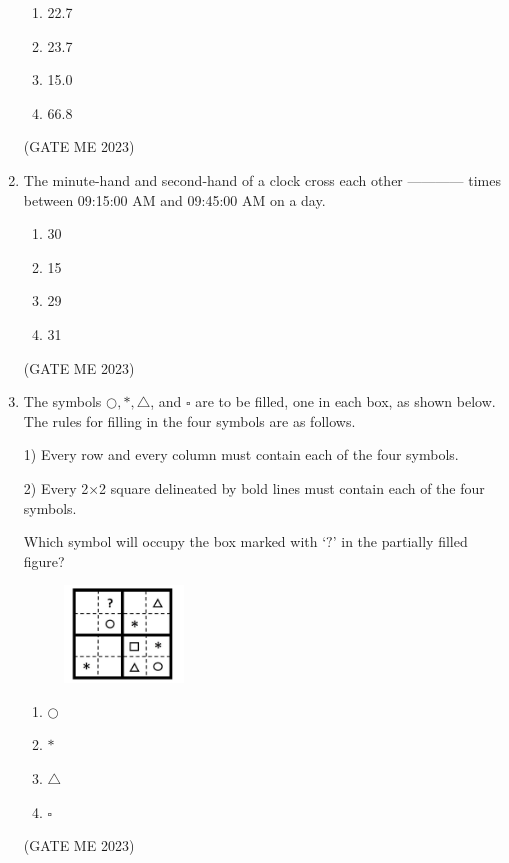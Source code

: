 \documentclass[journal]{IEEEtran}
\begin{document}
\begin{enumerate}
\begin{enumerate}
    \item 22.7
    \item 23.7
    \item 15.0
    \item 66.8
\end{enumerate}
\hfill (GATE ME 2023)

\item The minute-hand and second-hand of a clock cross each other ------------ times between 09:15:00 AM and 09:45:00 AM on a day.

\begin{enumerate}
    \item 30
    \item 15
    \item 29
    \item 31
\end{enumerate}
\hfill (GATE ME 2023)

\item The symbols $ \bigcirc, \ast, \triangle $, and $ \square $ are to be filled, one in each box, as shown below. The rules for filling in the four symbols are as follows.

1) Every row and every column must contain each of the four symbols.

2) Every 2×2 square delineated by bold lines must contain each of the four symbols.

Which symbol will occupy the box marked with ‘$ ? $’ in the partially filled figure?

\begin{figure}[H]
    \centering
    \includegraphics[width=0.3\textwidth]{Fig 2.png}
    \caption{}
    \label{fig:question5}
\end{figure}

\begin{enumerate}
    \item $ \bigcirc $
    \item $ \ast $
    \item $ \triangle $
    \item $ \square $
\end{enumerate}
\hfill (GATE ME 2023)


\end{enumerate}
\end{document}
